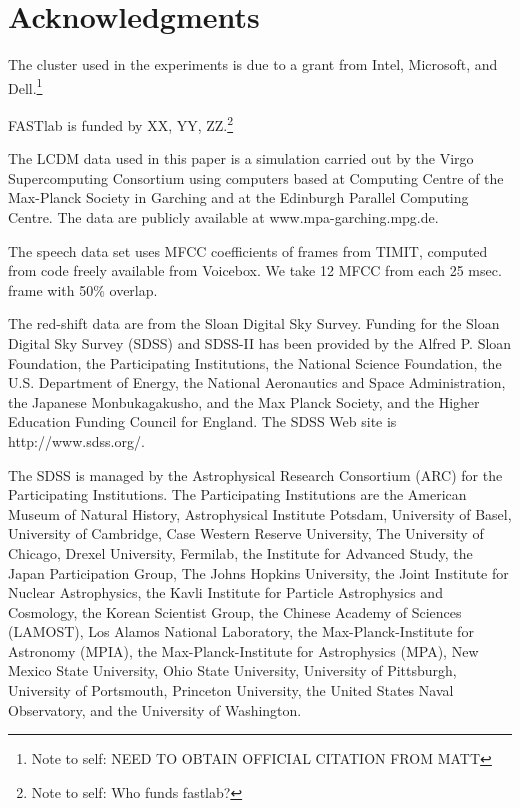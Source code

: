 \documentclass[twoside,leqno,twocolumn]{article}
\newcommand{\authornote}[1]{\footnote{Note to self: #1}}
\newcommand{\authorsnote}[1]{\authornote{#1}}
\begin{document}
\section{Acknowledgments}

{\small
The cluster used in the experiments is due to a grant from Intel, Microsoft, and Dell.\authorsnote{NEED TO OBTAIN OFFICIAL CITATION FROM MATT}

FASTlab is funded by XX, YY, ZZ.\authorsnote{Who funds fastlab?}

The LCDM data used in this paper is a simulation carried out by the Virgo Supercomputing Consortium using computers based at Computing Centre of the Max-Planck Society in Garching and at the Edinburgh Parallel Computing Centre. The data are publicly available at www.mpa-garching.mpg.de.

The speech data set uses MFCC coefficients of frames from TIMIT, computed from code freely available from Voicebox.
We take 12 MFCC from each 25 msec. frame with 50\% overlap.

The red-shift data are from the Sloan Digital Sky Survey.
Funding for the Sloan Digital Sky Survey (SDSS) and SDSS-II has been provided by the Alfred P. Sloan Foundation, the Participating Institutions, the National Science Foundation, the U.S. Department of Energy, the National Aeronautics and Space Administration, the Japanese Monbukagakusho, and the Max Planck Society, and the Higher Education Funding Council for England.
The SDSS Web site is http://www.sdss.org/.

The SDSS is managed by the Astrophysical Research Consortium (ARC) for the Participating Institutions.
The Participating Institutions are the American Museum of Natural History, Astrophysical Institute Potsdam, University of Basel, University of Cambridge, Case Western Reserve University, The University of Chicago, Drexel University, Fermilab, the Institute for Advanced Study, the Japan Participation Group, The Johns Hopkins University, the Joint Institute for Nuclear Astrophysics, the Kavli Institute for Particle Astrophysics and Cosmology, the Korean Scientist Group, the Chinese Academy of Sciences (LAMOST), Los Alamos National Laboratory, the Max-Planck-Institute for Astronomy (MPIA), the Max-Planck-Institute for Astrophysics (MPA), New Mexico State University, Ohio State University, University of Pittsburgh, University of Portsmouth, Princeton University, the United States Naval Observatory, and the University of Washington.
}




\end{document}
